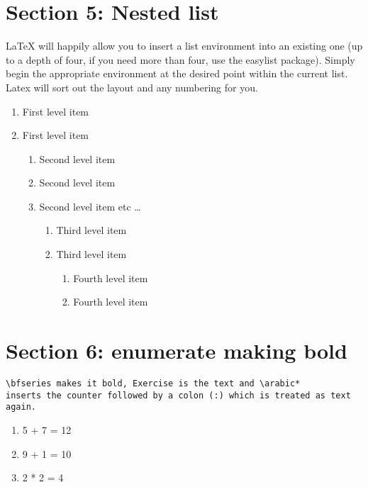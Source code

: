 \documentclass[14pt]{article}
\begin{document}
\section{Section 5: Nested list}
LaTeX will happily allow you to insert a list environment into an existing one 
(up to a depth of four, if you need more than four, use the easylist package). 
Simply begin the appropriate environment at the desired point within the 
current list. Latex will sort out the layout and any numbering for you.


\begin{enumerate}
   \item First level item
   \item First level item
   \begin{enumerate}
     \item Second level item
     \item Second level item
     \item Second level item etc \ldots
     \begin{enumerate}
       \item Third level item
       \item Third level item
       \begin{enumerate}
         \item Fourth level item
         \item Fourth level item
       \end{enumerate}
     \end{enumerate}
   \end{enumerate}
 \end{enumerate}

\section{Section 6: enumerate making bold}
\begin{verbatim}
\bfseries makes it bold, Exercise is the text and \arabic* 
inserts the counter followed by a colon (:) which is treated as text again.

\end{verbatim}
\begin{enumerate}[label=\bfseries Exercise \arabic*:]
  \item 5 + 7 = 12
  \item 9 + 1 = 10
  \item 2 * 2 = 4
\end{enumerate}
\end{document}
